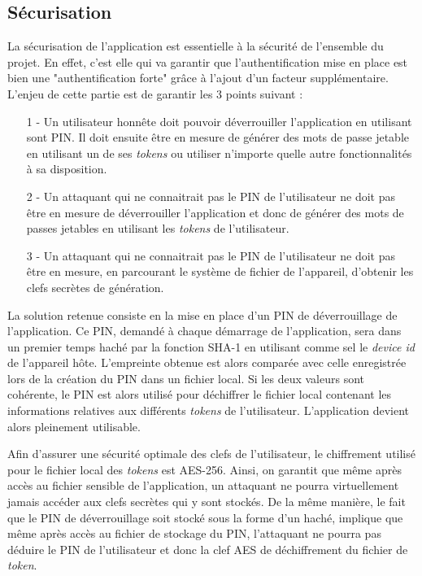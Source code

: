\subsection{Sécurisation}
\label{secu}
La sécurisation de l'application est essentielle à la sécurité de l'ensemble du projet. En
effet, c'est elle qui va garantir que l'authentification mise en place est bien une
"authentification forte" grâce à l'ajout d'un facteur supplémentaire. L'enjeu de cette 
partie est de garantir les 3 points suivant : 


\begin{itemize}
  \item[1 -] Un utilisateur honnête doit pouvoir déverrouiller l'application en utilisant 
  sont PIN. Il doit ensuite être en mesure de générer des mots de passe jetable en utilisant
  un de ses \emph{tokens} ou utiliser n'importe quelle autre fonctionnalités à sa
  disposition.
  \item[2 -] Un attaquant qui ne connaitrait pas le PIN de l'utilisateur ne doit pas être en
  mesure de déverrouiller l'application et donc de générer des mots de passes jetables en
  utilisant les \emph{tokens} de l'utilisateur.
  \item[3 -] Un attaquant qui ne connaitrait pas le PIN de l'utilisateur ne doit pas être en
  mesure, en parcourant le système de fichier de l'appareil, d'obtenir les clefs secrètes
  de génération.
\end{itemize}

La solution retenue consiste en la mise en place d'un PIN de déverrouillage de l'application.
Ce PIN, demandé à chaque démarrage de l'application, sera dans un premier temps haché par la
fonction SHA-1 en utilisant comme sel le \emph{device id} de l'appareil hôte. L'empreinte 
obtenue est alors comparée avec celle enregistrée lors de la création du PIN dans un fichier
local. Si les deux valeurs sont cohérente, le PIN est alors utilisé pour déchiffrer le
fichier local contenant les informations relatives aux différents \emph{tokens} de
l'utilisateur. L'application devient alors pleinement utilisable.

Afin d'assurer une sécurité optimale des clefs de l'utilisateur, le chiffrement utilisé pour
le fichier local des \emph{tokens} est AES-256. Ainsi, on garantit que même après accès au
fichier sensible de l'application, un attaquant ne pourra virtuellement jamais accéder aux
clefs secrètes qui y sont stockés. De la même manière, le fait que le PIN de déverrouillage
soit stocké sous la forme d'un haché, implique que même après accès au fichier de stockage du
PIN, l'attaquant ne pourra pas déduire le PIN de l'utilisateur et donc la clef AES de
déchiffrement du fichier de \emph{token}.




